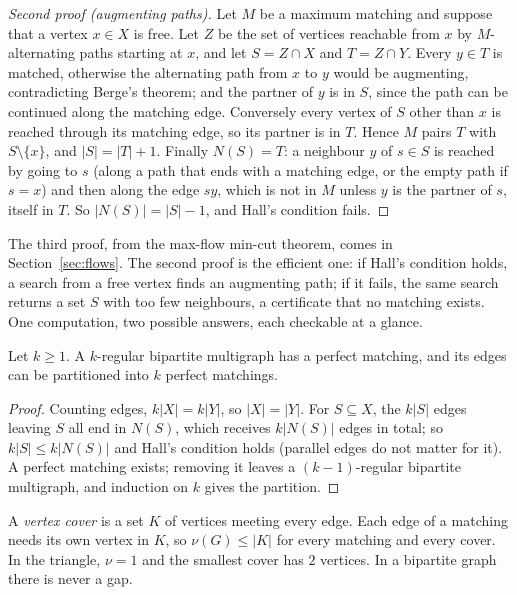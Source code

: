 \begin{proof}[Second proof (augmenting paths)]
Let $M$ be a maximum matching and suppose that a vertex $x\in X$ is free. Let $Z$ be the set of vertices reachable from $x$ by
$M$-alternating paths starting at $x$, and let $S=Z\cap X$ and $T=Z\cap Y$. Every $y\in T$ is matched, otherwise the alternating path from $x$
to $y$ would be augmenting, contradicting Berge's theorem; and the partner of $y$ is in $S$, since the path can be continued along
the matching edge. Conversely every vertex of $S$ other than $x$ is reached through its matching edge, so its partner is in $T$.
Hence $M$ pairs $T$ with $S\setminus\{x\}$, and $|S|=|T|+1$. Finally $N(S)=T$: a neighbour $y$ of $s\in S$ is reached by going to $s$ (along a path that
ends with a matching edge, or the empty path if $s=x$) and then along the edge $sy$, which is not in $M$ unless $y$ is the partner of $s$,
itself in $T$. So $|N(S)|=|S|-1$, and Hall's condition fails.
\end{proof}

The third proof, from the max-flow min-cut theorem, comes in Section~\ref{sec:flows}. The second proof is the efficient one: if
Hall's condition holds, a search from a free vertex finds an augmenting path; if it fails, the same search returns a set $S$ with
too few neighbours, a certificate that no matching exists. One computation, two possible answers, each checkable at a glance.

\begin{corollary}\label{cor:regular}
Let $k\ge1$. A $k$-regular bipartite multigraph has a perfect matching, and its edges can be partitioned into $k$ perfect matchings.
\end{corollary}
\begin{proof}
Counting edges, $k|X|=k|Y|$, so $|X|=|Y|$. For $S\subseteq X$, the $k|S|$ edges leaving $S$ all end in $N(S)$, which receives $k|N(S)|$ edges in total;
so $k|S|\le k|N(S)|$ and Hall's condition holds (parallel edges do not matter for it). A perfect matching exists; removing it leaves a
$(k-1)$-regular bipartite multigraph, and induction on $k$ gives the partition.
\end{proof}

A \emph{vertex cover} is a set $K$ of vertices meeting every edge. Each edge of a matching needs its own vertex in $K$, so
$\nu(G)\le|K|$ for every matching and every cover. In the triangle, $\nu=1$ and the smallest cover has $2$ vertices. In a bipartite
graph there is never a gap.

